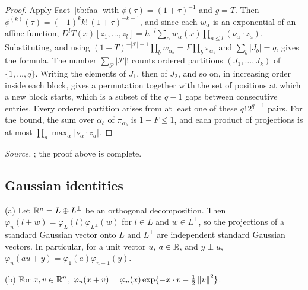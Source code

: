 \begin{proof}
Apply Fact~\ref{tb:faa} with \(\phi(\tau)=(1+\tau)^{-1}\) and \(g=T\). Then
\(\phi^{(k)}(\tau)=(-1)^kk!\,(1+\tau)^{-k-1}\), and since each \(w_\alpha\) is
an exponential of an affine function,
\(D^lT(x)[z_1,\ldots,z_l]=h^{-l}\sum_\alpha w_\alpha(x)\prod_{a\le l}
(\nu_\alpha\cdot z_a)\). Substituting, and using
\((1+T)^{-|\mathcal P|-1}\prod_bw_{\alpha_b}=F\prod_b\pi_{\alpha_b}\) and
\(\sum_b|J_b|=q\), gives the formula. The number
\(\sum_{\mathcal P}|\mathcal P|!\) counts ordered partitions
\((J_1,\ldots,J_k)\) of \(\{1,\ldots,q\}\). Writing the elements of
\(J_1\), then of \(J_2\), and so on, in increasing order inside each block,
gives a permutation together with the set of positions at which a new block
starts, which is a subset of the \(q-1\) gaps between consecutive entries.
Every ordered partition arises from at least one of these
\(q!\,2^{q-1}\) pairs. For the bound, the sum over \(\alpha_b\) of
\(\pi_{\alpha_b}\) is \(1-F\le1\), and each product of projections is
at most \(\prod_a\max_\alpha|\nu_\alpha\cdot z_a|\).
\end{proof}

\emph{Source.} ; the proof above is complete.

\subsection{Gaussian identities}\label{tb:sec:gauss}

\begin{fact}\label{tb:gauss-coord}
(a) Let \(\mathbb R^n=L\oplus L^\perp\) be an orthogonal decomposition. Then
\(\varphi_n(l+w)=\varphi_L(l)\varphi_{L^\perp}(w)\) for \(l\in L\) and
\(w\in L^\perp\), so the projections of a standard Gaussian vector onto
\(L\) and \(L^\perp\) are independent standard Gaussian vectors. In
particular, for a unit vector \(u\), \(a\in\mathbb R\), and \(y\perp u\),
\(\varphi_n(au+y)=\varphi_1(a)\varphi_{n-1}(y)\).

(b) For \(x,v\in\mathbb R^n\),
\(\varphi_n(x+v)=\varphi_n(x)\exp\{-x\cdot v-\tfrac12\left\lVert v\right\rVert^2\}\).
\end{fact}

